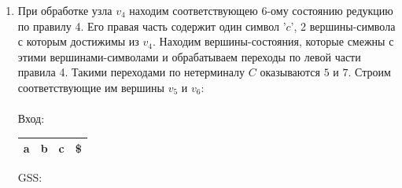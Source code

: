 \begin{example}
\begin{enumerate}
        \\

        \item При обработке узла $v_4$ находим соответствующею 6-ому состоянию редукцию по правилу 4. Его правая часть содержит один символ '$c$', 2 вершины-символа с которым достижимы из $v_4$. Находим вершины-состояния, которые смежны с этими вершинами-символами и обрабатываем переходы по левой части правила 4. Такими переходами по нетерминалу $C$ оказываются $5$ и $7$. Строим соответствующие им вершины $v_5$ и $v_6$:\\ \\
        Вход: \,
        \begin{tabular}[c]{ |c|c|c|c| }
            \hline a & b & c & \$ \\ \hline
        \end{tabular}
        \qquad GSS: \,
        \begin{tikzpicture}[x=0.5pt,y=0.5pt,yscale=-1,xscale=1]



\end{tikzpicture}
\end{enumerate}
\end{example}
